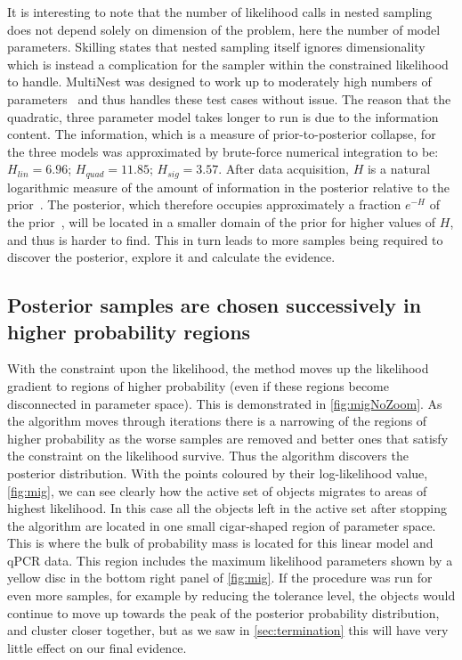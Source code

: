 It is interesting to note that the number of likelihood calls in nested sampling does not depend solely on dimension of the problem, here the number of model parameters.
Skilling states that nested sampling itself ignores dimensionality~\cite{Skilling2006} which is instead a complication for the sampler within the constrained likelihood to handle.
MultiNest was designed to work up to moderately high numbers of parameters~\cite{feroz2009multinest} and thus handles these test cases without issue.
The reason that the quadratic, three parameter model takes longer to run is due to the information content.
The information, which is a measure of prior-to-posterior collapse, for the three models was approximated by brute-force numerical integration to be: $H_{lin} = 6.96$; $H_{quad} = 11.85$; $H_{sig} = 3.57$.
After data acquisition, $H$ is a natural logarithmic measure of the amount of information in the posterior relative to the prior~\cite{sivia2006}.
The posterior, which therefore occupies approximately a fraction $e^{-H}$ of the prior~\cite{sivia2006}, will be located in a smaller domain of the prior for higher values of $H$, and thus is harder to find.
This in turn leads to more samples being required to discover the posterior, explore it and calculate the evidence.

\subsection{Posterior samples are chosen successively in higher probability regions}
With the constraint upon the likelihood, the method moves up the likelihood gradient to regions of higher probability (even if these regions become disconnected in parameter space).
This is demonstrated in \autoref{fig:migNoZoom}.
As the algorithm moves through iterations there is a narrowing of the regions of higher probability as the worse samples are removed and better ones that satisfy the constraint on the likelihood survive.
Thus the algorithm discovers the posterior distribution.
With the points coloured by their log-likelihood value, \autoref{fig:mig}, we can see clearly how the active set of objects migrates to areas of highest likelihood.
In this case all the objects left in the active set after stopping the algorithm are located in one small cigar-shaped region of parameter space.
This is where the bulk of probability mass is located for this linear model and qPCR data.
This region includes the maximum likelihood parameters shown by a yellow disc in the bottom right panel of \autoref{fig:mig}.
If the procedure was run for even more samples, for example by reducing the tolerance level, the objects would continue to move up towards the peak of the posterior probability distribution, and cluster closer together, but as we saw in \autoref{sec:termination} this will have very little effect on our final evidence.

